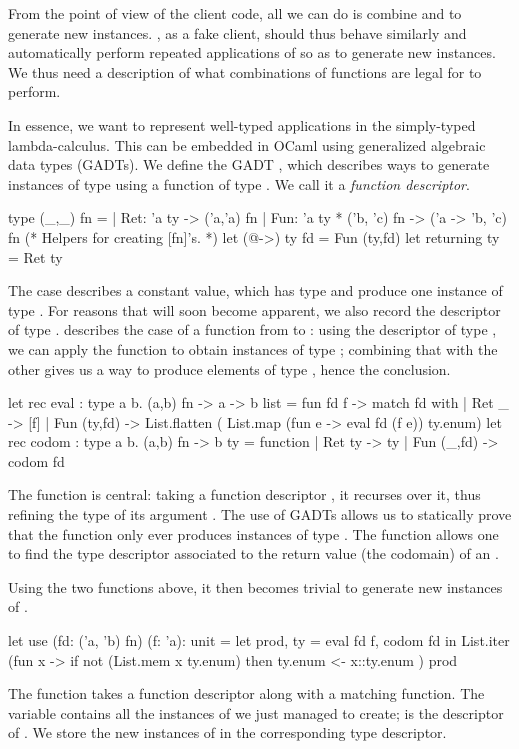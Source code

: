 From the point of view of the client code, all we can do is combine
 and  to generate new instances. \arti, as a fake client,
should thus behave similarly and automatically perform repeated applications of
 so as to generate new instances. We thus need a description of what
combinations of functions are legal for \arti to perform.

In essence, we want to represent well-typed applications in the
simply-typed lambda-calculus. This can be embedded in OCaml using generalized
algebraic data types (GADTs). We define the GADT , which
describes ways to generate instances of type  using a function of type
. We call it a \emph{function descriptor}.
%
\begin{ocamlcode}
type (_,_) fn =
| Ret: 'a ty -> ('a,'a) fn
| Fun: 'a ty * ('b, 'c) fn -> ('a -> 'b, 'c) fn
(* Helpers for creating [fn]'s. *)
let (@->) ty fd = Fun (ty,fd)
let returning ty = Ret ty
\end{ocamlcode}
%
The  case describes a constant value, which has type  and
produce one instance of type . For reasons that will soon become
apparent, we also record the descriptor of type .  describes
the case of a function from  to : using the descriptor of type
, we can apply the function to obtain instances of type ;
combining that with the other  gives us a way to produce
elements of type , hence the  conclusion.
%
\begin{ocamlcode}
let rec eval : type a b. (a,b) fn -> a -> b list =
  fun fd f ->
    match fd with
    | Ret _ -> [f]
    | Fun (ty,fd) -> List.flatten (
        List.map (fun e -> eval fd (f e)) ty.enum)
let rec codom : type a b. (a,b) fn -> b ty =
  function
    | Ret ty -> ty
    | Fun (_,fd) -> codom fd
\end{ocamlcode}
%
The  function is central: taking a function descriptor , it
recurses over it, thus refining the type of its argument . The use of
GADTs allows us to statically prove that the  function only ever
produces instances of type .
%
The  function allows one to find the type
descriptor associated to the return value (the codomain) of an .

Using the two functions above, it then becomes trivial to generate new instances
of .

\begin{ocamlcode}
let use (fd: ('a, 'b) fn) (f: 'a): unit =
  let prod, ty = eval fd f, codom fd in
  List.iter (fun x -> 
    if not (List.mem x ty.enum)
    then ty.enum <- x::ty.enum
  ) prod
\end{ocamlcode}
%
The function takes a function descriptor along with a matching function. The
 variable contains all the instances of  we just managed to
create;  is the descriptor of . We store the new
instances of  in the corresponding type descriptor.

